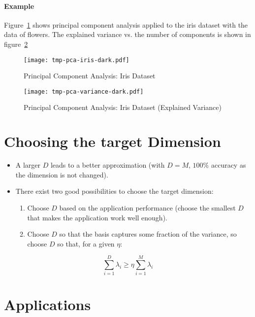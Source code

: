 			\paragraph{Example}
				Figure~\ref{fig:pcaIris} shows principal component analysis applied to the iris dataset with the data of flowers. The explained variance vs. the number of components is shown in figure~\ref{fig:pcaIrisVariance}
				
				\begin{figure}
					\centering
					\texttt{[image: tmp-pca-iris-dark.pdf]}
					\caption{Principal Component Analysis: Iris Dataset}
					\label{fig:pcaIris}
				\end{figure}
				\begin{figure}
					\centering
					\texttt{[image: tmp-pca-variance-dark.pdf]}
					\caption{Principal Component Analysis: Iris Dataset (Explained Variance)}
					\label{fig:pcaIrisVariance}
				\end{figure}

	\section{Choosing the target Dimension}
		\begin{itemize}
			\item A larger \(D\) leads to a better approximation (with \( D = M \), \(100\%\) accuracy as the dimension is not changed).
			\item There exist two good possibilities to choose the target dimension:
				\begin{enumerate}
					\item Choose \(D\) based on the application performance (choose the smallest \(D\) that makes the application work well enough).
					\item Choose \(D\) so that the basis captures some fraction of the variance, so choose \( D \) so that, for a given \( \eta \):
				\end{enumerate}
		\end{itemize}
		\begin{equation}
			\sum_{i = 1}^{D} \lambda_i \geq \eta \sum_{i = 1}^{M} \lambda_i
		\end{equation}

	\section{Applications} %
	
